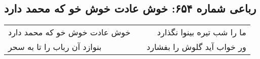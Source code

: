 \begin{center}
\section*{رباعی شماره ۶۵۴: خوش عادت خوش خو که محمد دارد}
\label{sec:0654}
\begin{longtable}{l p{0.5cm} r}
خوش عادت خوش خو که محمد دارد
&&
ما را شب تیره بینوا نگذارد
\\
بنوازد آن رباب را تا به سحر
&&
ور خواب آید گلوش را بفشارد
\\
\end{longtable}
\end{center}
